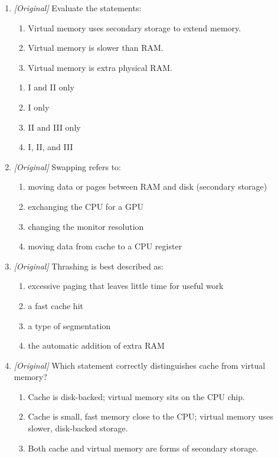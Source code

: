\begin{enumerate}[label=\textbf{Q\arabic*.}, leftmargin=*]
\item \textit{[Original]} Evaluate the statements:
  \begin{enumerate}[label=\Roman*.]
    \item Virtual memory uses secondary storage to extend memory.
    \item Virtual memory is slower than RAM.
    \item Virtual memory is extra physical RAM.
  \end{enumerate}
  \begin{enumerate}[label=\Alph*.]
    \item I and II only
    \item I only
    \item II and III only
    \item I, II, and III
  \end{enumerate}
\item \textit{[Original]} Swapping refers to:
  \begin{enumerate}[label=\Alph*.]
    \item moving data or pages between RAM and disk (secondary storage)
    \item exchanging the CPU for a GPU
    \item changing the monitor resolution
    \item moving data from cache to a CPU register
  \end{enumerate}
\item \textit{[Original]} Thrashing is best described as:
  \begin{enumerate}[label=\Alph*.]
    \item excessive paging that leaves little time for useful work
    \item a fast cache hit
    \item a type of segmentation
    \item the automatic addition of extra RAM
  \end{enumerate}
\item \textit{[Original]} Which statement correctly distinguishes cache from
  virtual memory?
  \begin{enumerate}[label=\Alph*.]
    \item Cache is disk-backed; virtual memory sits on the CPU chip.
    \item Cache is small, fast memory close to the CPU; virtual memory uses
      slower, disk-backed storage.
    \item Both cache and virtual memory are forms of secondary storage.

\end{enumerate}
\end{enumerate}
